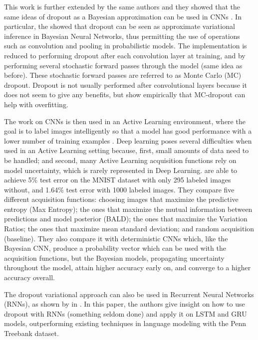 This work is further extended by the same authors and they showed that the same ideas of dropout as a Bayesian approximation can be used in CNNs \cite{gal2015bayesian}. In particular, the showed that dropout can be seen as approximate variational inference in Bayesian Neural Networks, thus permitting the use of operations such as convolution and pooling in probabilistic models. The implementation is reduced to performing dropout after each convolution layer at training, and by performing several stochastic forward passes through the model (same idea as before). These stochastic forward passes are referred to as Monte Carlo (MC) dropout. Dropout is not usually performed after convolutional layers because it does not seem to give any benefits, but \citeauthor{gal2015bayesian} show empirically that MC-dropout can help with overfitting.

The work on CNNs is then used in an Active Learning environment, where the goal is to label images intelligently so that a model has good performance with a lower number of training examples \cite{Gal2016Active}. Deep learning poses several difficulties when used in an Active Learning setting because, first, small amounts of data need to be handled; and second, many Active Learning acquisition functions rely on model uncertainty, which is rarely represented in Deep Learning. \citeauthor{Gal2016Active} are able to achieve 5\% test error on the MNIST dataset with only 295 labeled images without, and 1.64\% test error with 1000 labeled images. They compare five different acquisition functions: choosing images that maximize the predictive entropy (Max Entropy); the ones that maximize the mutual information between predictions and model posterior (BALD); the ones that maximize the Variation Ratios; the ones that maximize mean standard deviation; and random acquisition (baseline). They also compare it with deterministic CNNs which, like the Bayesian CNN, produce a probability vector which can be used with the acquisition functions, but the Bayesian models, propagating uncertainty throughout the model, attain higher accuracy early on, and converge to a higher accuracy overall.

The dropout variational approach can also be used in Recurrent Neural Networks (RNNs), as shown by \citeauthor{gal2016theoretically} in \cite{gal2016theoretically}. In this paper, the authors give insight on how to use dropout with RNNs (something seldom done) and apply it on LSTM and GRU models, outperforming existing techniques in language modeling with the Penn Treebank dataset.

